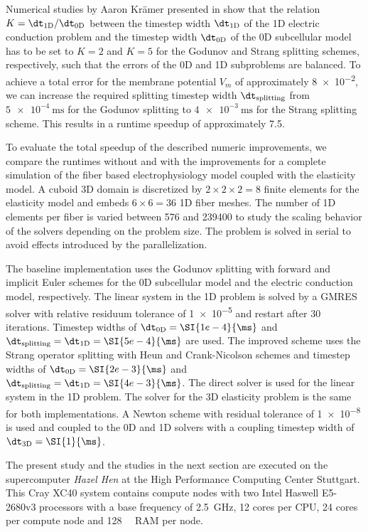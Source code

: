 Numerical studies by Aaron Krämer presented in \cite{Bradley:2018:EDB} show that the relation $K=\dt_\text{1D}/\dt_\text{0D}$ between the timestep width $\dt_\text{1D}$ of the 1D electric conduction problem and the timestep width $\dt_\text{0D}$ of the 0D subcellular model has to be set to $K=2$ and $K=5$ for the Godunov and Strang splitting schemes, respectively, such that the errors of the 0D and 1D subproblems are balanced. To achieve a total error for the membrane potential $V_m$ of approximately \num{8e-2}, we can increase the required splitting timestep width $\dt_\text{splitting}$ from $\SI{5e-4}{\ms}$ for the Godunov splitting to $\SI{4e-3}{\ms}$ for the Strang splitting scheme. This results in a runtime speedup  of approximately 7.5.

To evaluate the total speedup of the described numeric improvements, we compare the runtimes without and with the improvements for a complete simulation of the fiber based electrophysiology model coupled with the elasticity model. A cuboid 3D domain is discretized by $2\times 2\times 2=8$ finite elements for the elasticity model and embeds $6\times 6=36$ 1D fiber meshes. The number of 1D elements per fiber is varied between 576 and \num{239400} to study the scaling behavior of the solvers depending on the problem size. The problem is solved in serial to avoid effects introduced by the parallelization.

The baseline implementation uses the Godunov splitting with forward and implicit Euler schemes for the 0D subcellular model and the electric conduction model, respectively. The linear system in the 1D problem is solved by a GMRES solver with relative residuum tolerance of \num{1e-5} and restart after 30 iterations. Timestep widths of $\dt_\text{0D}=\SI{1e-4}{\ms}$ and $\dt_\text{splitting}=\dt_\text{1D}=\SI{5e-4}{\ms}$ are used. The improved scheme uses the Strang operator splitting with Heun and Crank-Nicolson schemes and timestep widths of $\dt_\text{0D}=\SI{2e-3}{\ms}$ and $\dt_\text{splitting}=\dt_\text{1D} = \SI{4e-3}{\ms}$. The direct solver is used for the linear system in the 1D problem.
The solver for the 3D elasticity problem is the same for both implementations. A Newton scheme with residual tolerance of \num{1e-8} is used
 and coupled to the 0D and 1D solvers with a coupling timestep width of $\dt_\text{3D}=\SI{1}{\ms}$.

The present study and the studies in the next section are executed on the supercomputer \emph{Hazel Hen} at the High Performance Computing Center Stuttgart. This Cray XC40 system contains compute nodes with two Intel Haswell E5-2680v3 processors with a base frequency of \SI{2.5}{\giga\hertz}, 12 cores per CPU, 24 cores per compute node and \SI{128}{\giga\byte} RAM per node.

